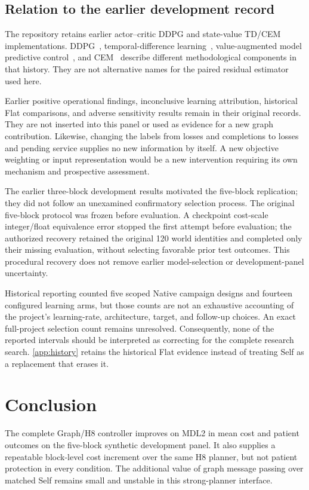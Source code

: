 \documentclass[preprint,12pt]{elsarticle}
\begin{document}
\subsection{Relation to the earlier development record}
The repository retains earlier actor--critic DDPG and state-value TD/CEM
implementations. DDPG~\cite{Lillicrap2016}, temporal-difference
learning~\cite{Sutton1988}, value-augmented model predictive
control~\cite{Hansen2022}, and CEM~\cite{DeBoer2005} describe different
methodological components in that history. They are not alternative names for
the paired residual estimator used here.

Earlier positive operational findings, inconclusive learning attribution,
historical Flat comparisons, and adverse sensitivity results remain in their
original records. They are not inserted into this panel or used as evidence
for a new graph contribution. Likewise, changing the labels from losses and
completions to losses and pending service supplies no new information by itself.
A new objective weighting or input representation would be a new intervention
requiring its own mechanism and prospective assessment.

The earlier three-block development results motivated the five-block
replication; they did not follow an unexamined confirmatory selection process.
The original five-block protocol was frozen before evaluation. A checkpoint
cost-scale integer/float equivalence error stopped the first attempt before
evaluation; the authorized recovery retained the original 120 world identities
and completed only their missing evaluation, without selecting favorable prior
test outcomes. This procedural recovery does not remove earlier model-selection
or development-panel uncertainty.

Historical reporting counted five scoped Native campaign designs and fourteen
configured learning arms, but those counts are not an exhaustive accounting of
the project's learning-rate, architecture, target, and follow-up choices.
An exact full-project selection count remains unresolved. Consequently, none
of the reported intervals should be interpreted as correcting for the complete
research search. \ref{app:history} retains the historical Flat evidence
instead of treating Self as a replacement that erases it.

\section{Conclusion}
The complete Graph/H8 controller improves on MDL2 in mean cost and patient
outcomes on the five-block synthetic development panel. It also supplies a
repeatable block-level cost increment
over the same H8 planner, but not patient protection in every condition.
The additional value of graph message passing over matched Self remains small
and unstable in this strong-planner interface.
\end{document}
